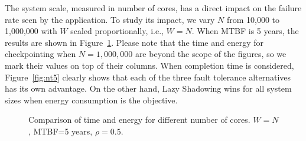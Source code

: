 The system scale, measured in number of cores, has a direct impact on the failure rate seen by the application. To study its impact, we vary $N$ from 10,000 to 1,000,000 with $W$ scaled proportionally, i.e., $W=N$. When MTBF is 5 years, the results are shown in Figure~\ref{fig:n5}. Please note that the time and energy for checkpointing when $N=1,000,000$ are beyond the scope of the figures, so we mark their values on top of their columns. When completion time is considered, Figure~\ref{fig:nt5} clearly shows that each of the three fault tolerance alternatives has its own advantage. %
On the other hand, Lazy Shadowing wins for all system sizes when energy consumption is the objective. 


\begin{figure}[!t]
	\captionsetup{justification=centering}
	\begin{center}
	\end{center}
	\caption{Comparison of time and energy for different number of cores. $W=N$, MTBF=5 years, $\rho=0.5$.}
	\label{fig:n5}
\end{figure}

